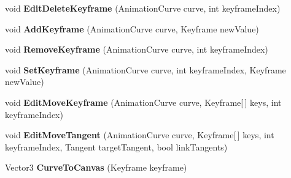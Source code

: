 \begin{DoxyCompactItemize}
\item 
\mbox{\label{class_unity_editor_1_1_post_processing_1_1_curve_editor_a02f3c40e8d9617d9754b63011b25af27}} 
void {\bfseries Edit\+Delete\+Keyframe} (Animation\+Curve curve, int keyframe\+Index)
\item 
\mbox{\label{class_unity_editor_1_1_post_processing_1_1_curve_editor_adbb58f379bc3183abe496632bd09e05f}} 
void {\bfseries Add\+Keyframe} (Animation\+Curve curve, Keyframe new\+Value)
\item 
\mbox{\label{class_unity_editor_1_1_post_processing_1_1_curve_editor_a3260950dca4d6d935579140cba52a233}} 
void {\bfseries Remove\+Keyframe} (Animation\+Curve curve, int keyframe\+Index)
\item 
\mbox{\label{class_unity_editor_1_1_post_processing_1_1_curve_editor_af7c48e51a12779a74b4ec719ea831a1b}} 
void {\bfseries Set\+Keyframe} (Animation\+Curve curve, int keyframe\+Index, Keyframe new\+Value)
\item 
\mbox{\label{class_unity_editor_1_1_post_processing_1_1_curve_editor_a60814ca45b07f2cfa2d9249e4b324963}} 
void {\bfseries Edit\+Move\+Keyframe} (Animation\+Curve curve, Keyframe\mbox{[}$\,$\mbox{]} keys, int keyframe\+Index)
\item 
\mbox{\label{class_unity_editor_1_1_post_processing_1_1_curve_editor_a1752c3a0977878ebdd7d123ab18065df}} 
void {\bfseries Edit\+Move\+Tangent} (Animation\+Curve curve, Keyframe\mbox{[}$\,$\mbox{]} keys, int keyframe\+Index, Tangent target\+Tangent, bool link\+Tangents)
\item 
\mbox{\label{class_unity_editor_1_1_post_processing_1_1_curve_editor_ad75f917c81c41b5d84cb01e0fc832c19}} 
Vector3 {\bfseries Curve\+To\+Canvas} (Keyframe keyframe)
\item 
\mbox{\label{class_unity_editor_1_1_post_processing_1_1_curve_editor_af5be0d84c60f6d2085dca15a058764fc}} 

\end{DoxyCompactItemize}
